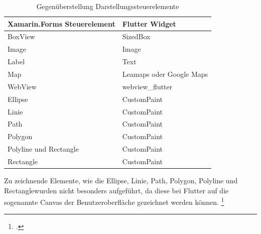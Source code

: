 \begin{table}[!ht]
\begin{tabularx}{\textwidth}{X|X}
   \textbf{Xamarin.Forms Steuerelement} & \textbf{Flutter Widget}  \\
\hline
	BoxView		       			&   	 SizedBox  		\\ 
	Image       						&	     Image	 			\\ 
	Label       						&  	Text 					\\ 
	Map            					&	   	Leamaps oder Google Maps \\ 
	WebView            			&  	webview\_flutter	\\ 
	Ellipse							&  	CustomPaint	\\ 
	Linie								&	  	CustomPaint	\\ 
	Path  							&  	CustomPaint	\\ 
	Polygon  						&  	CustomPaint	\\ 
	Polyline und Rectangle  &  	CustomPaint	\\ 
	Rectangle  					&  	CustomPaint	\\ 

\end{tabularx}
\caption{Gegenüberstellung Darstellungssteuerelemente}
 \label{tab:ControlsVisualization}
\end{table}
Zu zeichnende Elemente, wie die  \glq Ellipse\grq{}, \glq Linie\grq{}, \glq Path\grq{},  \glq Polygon\grq{},  \glq Polyline\grq{}  und \glq Rectangle\grq{}wurden nicht besonders aufgeführt,  da diese bei Flutter auf die sogenannte Canvas der Benutzeroberfläche gezeichnet werden können.  \footcite[Vgl.][Abgerufen am \today]{GoogleFlutterCanvas2020} 

